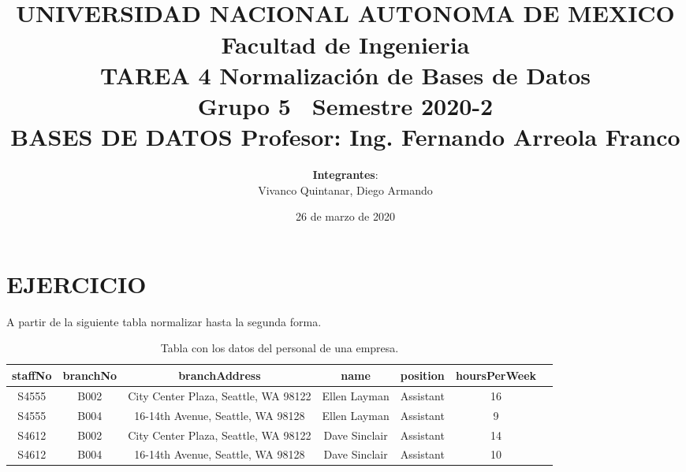 \documentclass[spanish]{article}
\begin{document}
\title{
\\
UNIVERSIDAD NACIONAL AUTONOMA DE MEXICO\\
\vfill
Facultad de Ingenieria\\
\vfill
{\bfseries TAREA 4}
\vfill
{\bfseries Normalización de Bases de Datos }
\vfill
\\Grupo 5\
\vfill
Semestre 2020-2\\
\vfill
BASES DE DATOS
\vfill
Profesor: Ing. Fernando Arreola Franco}
\vfill
\author{\textbf{Integrantes}:\\
Vivanco Quintanar, Diego Armando\\}
\date{26 de marzo de 2020}
\maketitle
\newpage
\section{EJERCICIO}

    A partir de la siguiente tabla normalizar hasta la segunda forma.
    
    \begin{table}[ht]
    \centering
	\begin{tabular}{|c|c|c|c|c|c|l|}
	\hline
	\rowcolor{LightBlue2}
	\textbf{staffNo} & \textbf{branchNo} & \textbf{branchAddress} &  \textbf{name} & \textbf{position} & \textbf{hoursPerWeek}\\ \hline
	 S4555 & B002 & City Center Plaza, Seattle, WA 98122 & Ellen Layman & Assistant & 16\\ \hline
	 S4555 & B004 & 16-14th Avenue, Seattle, WA 98128 & Ellen Layman & Assistant & 9\\ \hline
	 S4612 & B002 & City Center Plaza, Seattle, WA 98122 & Dave Sinclair & Assistant & 14\\ \hline
	 S4612 & B004 & 16-14th Avenue, Seattle, WA 98128 & Dave Sinclair & Assistant & 10\\ \hline
	\end{tabular}
	\caption{Tabla con los datos del personal de una empresa.} \label{semi}
	\end{table}
	
\end{document}
